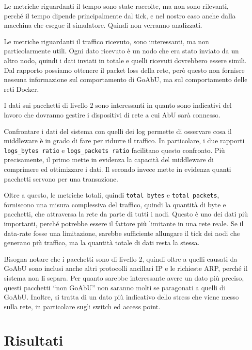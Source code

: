 \documentclass[12pt, a4paper]{article}
\begin{document}
Le metriche riguardanti il tempo sono state raccolte, ma non sono rilevanti, perché il tempo dipende principalmente dal tick, e nel nostro caso anche dalla macchina che esegue il simulatore. Quindi non verranno analizzati.

Le metriche riguardanti il traffico ricevuto, sono interessanti, ma non particolarmente utili. Ogni dato ricevuto è un nodo che era stato inviato da un altro nodo, quindi i dati inviati in totale e quelli ricevuti dovrebbero essere simili.
Dal rapporto possiamo ottenere il packet loss della rete, però questo non fornisce nessuna informazione sul comportamento di GoAbU, ma sul comportamento delle reti Docker.

I dati sui pacchetti di livello 2 sono interessanti in quanto sono indicativi del lavoro che dovranno gestire i dispositivi di rete a cui AbU sarà connesso.

Confrontare i dati del sistema con quelli dei log permette di osservare cosa il middleware è in grado di fare per ridurre il traffico. In particolare, i due rapporti \lstinline{logs_bytes ratio} e \lstinline{logs_packets ratio} facilitano questo confronto.
Più precisamente, il primo mette in evidenza la capacità del middleware di comprimere ed ottimizzare i dati.
Il secondo invece mette in evidenza quanti pacchetti servono per una transazione.

Oltre a questo, le metriche totali, quindi \lstinline{total bytes} e \lstinline{total packets}, forniscono una misura complessiva del traffico, quindi la quantità di byte e pacchetti, che attraversa la rete da parte di tutti i nodi.
Questo è uno dei dati più importanti, perché potrebbe essere il fattore più limitante in una rete reale. Se il data-rate fosse una limitazione, sarebbe sufficiente allungare il tick dei nodi che generano più traffico, ma la quantità totale di dati resta la stessa.

Bisogna notare che i pacchetti sono di livello 2, quindi oltre a quelli causati da GoAbU sono inclusi anche altri protocolli ancillari IP e le richieste ARP, perché il sistema non li separa.
Per quanto sarebbe interessante avere un dato più preciso, questi pacchetti ``non GoAbU'' non saranno molti se paragonati a quelli di GoAbU. Inoltre, si tratta di un dato più indicativo dello stress che viene messo sulla rete, in particolare sugli switch ed access point.

\newpage

\section{Risultati}\label{risultati}
\end{document}

